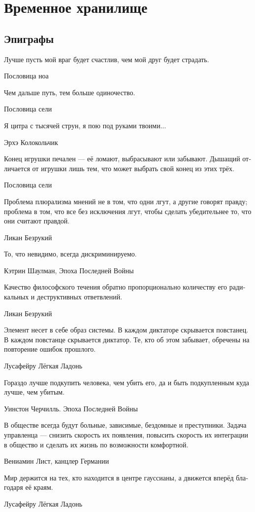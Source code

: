 \documentclass[a4paper,12pt,fleqn]{book}\usepackage{polyglossia}\setdefaultlanguage[babelshorthands=true]{russian}\setotherlanguage{english}\defaultfontfeatures{Ligatures=TeX,Mapping=tex-text}\usepackage{xcolor}\newcommand{\ml}[3]{#2}
\begin{document}
{\part{Временное хранилище}

\chapter{Эпиграфы}

\epigraph{
\ml{$0$}
{Лучше пусть мой враг будет счастлив, чем мой друг будет страдать.}
{I'd rather see my foe happy than my friend suffering.}
}{Пословица ноа}

\epigraph{
\ml{$0$}
{Чем дальше путь, тем больше одиночество.}
{The longer the way, the lonelier the way.}
}{Пословица сели}

\epigraph{Я цитра с тысячей струн, я пою под руками твоими...}
{Эрхэ Колокольчик}

\epigraph{
Конец игрушки печален --- её ломают, выбрасывают или забывают.
Дышащий отличается от игрушки лишь тем, что может выбрать свой конец из этих трёх.
}{
Пословица сели
}

\epigraph
{Проблема плюрализма мнений не в том, что одни лгут, а другие говорят правду;
проблема в том, что все без исключения лгут, чтобы сделать убедительнее то, что они считают правдой.}
{Ликан Безрукий}

\epigraph{
\ml{$0$}
{То, что невидимо, всегда дискриминируемо.}
{Invisible is always discriminated.}
}{
\ml{$0$}
{Кэтрин Шаулман, Эпоха Последней Войны}
{Catherine Shoulmann}}

\epigraph
{Качество философского течения обратно пропорционально количеству его радикальных и деструктивных ответвлений.}
{Ликан Безрукий}

\epigraph
{Элемент несет в себе образ системы.
В каждом диктаторе скрывается повстанец.
В каждом повстанце скрывается диктатор.
Те, кто об этом забывает, обречены на повторение ошибок прошлого.}
{Лусафейру Лёгкая Ладонь}

\epigraph
{Гораздо лучше подкупить человека, чем убить его, да и быть подкупленным куда лучше, чем убитым.}
{Уинстон Черчилль.
Эпоха Последней Войны}

\epigraph
{В обществе всегда будут больные, зависимые, бездомные и преступники.
Задача управленца --- снизить скорость их появления, повысить скорость их интеграции в общество и сделать их жизнь по возможности комфортной.}
{Вениамин Лист, канцлер Германии}

\epigraph
{Мир держится на тех, кто находится в центре гауссианы, а движется вперёд благодаря её краям.}
{Лусафейру Лёгкая Ладонь}

}
\end{document}
